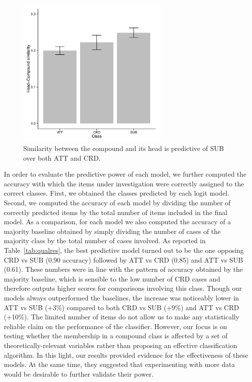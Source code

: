 \documentclass[output=paper]{langsci/langscibook}
\begin{document}
\begin{figure}[p]
\begin{center}
\includegraphics[width=7.5cm]{figures/barplot2.pdf}
\caption{Similarity between the compound and its head is predictive of SUB over both ATT and CRD.}\label{fig:bar2}
\end{center}
\end{figure}


In order to evaluate the predictive power of each model, we further computed the accuracy with which the items under investigation were correctly assigned to the correct classes. First, we obtained the classes predicted by each logit model. Second, we computed the accuracy of each model by dividing the number of correctly predicted items by the total number of items included in the final model. As a comparison, for each model we also computed the accuracy of a majority baseline obtained by simply dividing the number of cases of the majority class by the total number of cases involved.  As reported in Table~\ref{tab:qualres}, the best predictive model turned out to be the one opposing CRD vs SUB (0.90 accuracy) followed by ATT vs CRD (0.85) and ATT vs SUB (0.61). These numbers were in line with the pattern of accuracy obtained by the majority baseline, which is sensible to the low number of CRD cases and therefore outputs higher scores for comparisons involving this class. Though our models always outperformed the baselines, the increase was noticeably lower in ATT vs SUB (+3\%) compared to both CRD vs SUB (+9\%) and ATT vs CRD (+10\%). The limited number of items do not allow us to make any statistically reliable claim on the performance of the classifier. However, our focus is on testing whether the membership in a compound class is affected by a set of theoretically-relevant variables rather than proposing an effective classification algorithm. In this light, our results provided evidence for the effectiveness of these models. At the same time, they suggested that experimenting with more data would be desirable to further validate their power.
\end{document}
